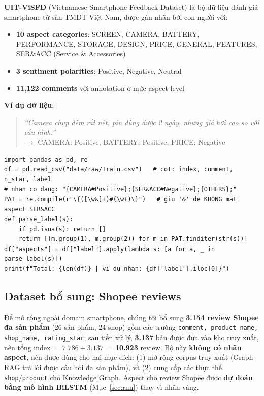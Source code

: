 \documentclass[12pt,a4paper]{article}
\begin{document}
\textbf{UIT-ViSFD} (Vietnamese Smartphone Feedback Dataset) là bộ dữ liệu đánh giá smartphone từ sàn TMĐT Việt Nam, được gán nhãn bởi con người với:

\begin{itemize}
  \item \textbf{10 aspect categories}: SCREEN, CAMERA, BATTERY, PERFORMANCE, STORAGE, DESIGN, PRICE, GENERAL, FEATURES, SER\&ACC (Service \& Accessories)
  \item \textbf{3 sentiment polarities}: Positive, Negative, Neutral
  \item \textbf{11,122 comments} với annotation ở mức aspect-level
\end{itemize}

\textbf{Ví dụ dữ liệu}:
\begin{quote}
\textit{``Camera chụp đêm rất nét, pin dùng được 2 ngày, nhưng giá hơi cao so với cấu hình.''}\\
$\rightarrow$ CAMERA: Positive, BATTERY: Positive, PRICE: Negative
\end{quote}

\begin{lstlisting}[caption={Tải và parse nhãn UIT-ViSFD (đúng định dạng thực tế)}]
import pandas as pd, re
df = pd.read_csv("data/raw/Train.csv")   # cot: index, comment, n_star, label
# nhan co dang: "{CAMERA#Positive};{SER&ACC#Negative};{OTHERS};"
PAT = re.compile(r"\{([\w&]+)#(\w+)\}")   # giu '&' de KHONG mat aspect SER&ACC
def parse_label(s):
    if pd.isna(s): return []
    return [(m.group(1), m.group(2)) for m in PAT.finditer(str(s))]
df["aspects"] = df["label"].apply(lambda s: [a for a, _ in parse_label(s)])
print(f"Total: {len(df)} | vi du nhan: {df['label'].iloc[0]}")
\end{lstlisting}

\subsection{Dataset bổ sung: Shopee reviews}

Để mở rộng ngoài domain smartphone, chúng tôi bổ sung \textbf{3.154 review Shopee đa sản phẩm} (26 sản phẩm, 24 shop) gồm các trường \texttt{comment, product\_name, shop\_name, rating\_star}; sau tiền xử lý, \textbf{3.137} bản được đưa vào kho truy xuất, nên tổng index $=7.786+3.137=$ \textbf{10.923} review. Bộ này \textbf{không có nhãn aspect}, nên được dùng cho hai mục đích: (1) mở rộng corpus truy xuất (Graph RAG trả lời được câu hỏi đa sản phẩm), và (2) cung cấp các thực thể \texttt{shop}/\texttt{product} cho Knowledge Graph. Aspect cho review Shopee được \textbf{dự đoán bằng mô hình BiLSTM} (Mục~\ref{sec:rnn}) thay vì nhãn vàng.
\end{document}
